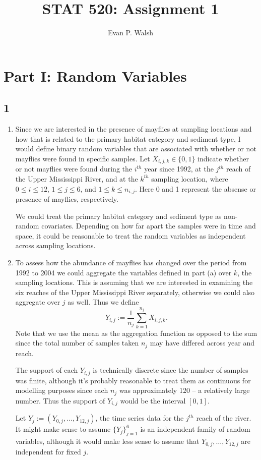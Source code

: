 \documentclass[12pt]{article}
\title{STAT 520: Assignment 1}
\author{Evan P. Walsh}
\begin{document}
\maketitle


\section*{Part I: Random Variables}

\subsection*{1}
\begin{enumerate}[label=(\alph*)]
  \item Since we are interested in the presence of mayflies at sampling locations and how that is related to the primary habitat category and sediment
    type, I would define binary random variables that are associated with whether or not mayflies were found in specific samples.
    Let $X_{i,j,k} \in \{0,1\}$ indicate whether or not mayflies were found during the $i^{th}$ year since 1992, at the $j^{th}$ reach of the Upper
    Mississippi River, and at the $k^{th}$ sampling location, where $0 \leq i \leq 12$, $1 \leq j \leq 6$, and $1 \leq k \leq n_{i,j}$.
    Here 0 and 1 represent the absense or presence of mayflies, respectively.

    We could treat the primary habitat category and sediment type as non-random covariates. Depending on how far apart the samples were in time and
    space, it could be reasonable to treat the random variables as independent across sampling locations.

  \item To assess how the abundance of mayflies has changed over the period from 1992 to 2004 we could aggregate the variables defined in part (a)
    over $k$, the sampling locations. This is assuming that we are interested in examining the six reaches of the Upper Mississippi River separately, otherwise we could also
    aggregate over $j$ as well. Thus we define 
    \[
      Y_{i,j} := \frac{1}{n_{j}}\sum_{k=1}^{n_{j}}X_{i,j,k}. 
    \]
    Note that we use the mean as the aggregation function
    as opposed to the sum since the total number of samples taken $n_{j}$ may have differed across year and reach.

    The support of each $Y_{i,j}$ is technically discrete since the number of samples was finite, although it's probably reasonable to treat them as
    continuous for modelling purposes since each $n_{j}$ was approximately 120 -- a relatively large number. Thus the support of $Y_{i,j}$ would be
    the interval $[0, 1]$.

    Let $Y_{j} := (Y_{0,j}, \dots, Y_{12, j})$, the time series data for the $j^{th}$ reach of the river. It might make sense to assume
    $\{Y_j\}_{j=1}^{6}$ is an independent family of random variables, although it would make less sense to assume that $Y_{0,j}, \dots, Y_{12,j}$ are
    independent for fixed $j$.
\end{enumerate}
\end{document}
